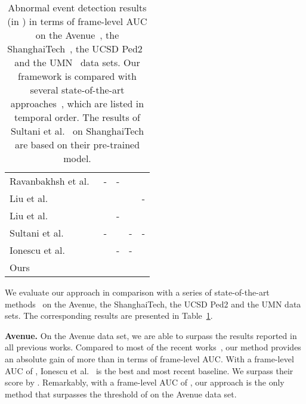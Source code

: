 \documentclass[10pt,twocolumn,letterpaper]{article}
\begin{document}
\begin{table}[t]
{\begin{center}
\begin{tabular}{|l|c|c|c|c|}
Ravanbakhsh et al.~\cite{Ravanbakhsh-WACV-2018}	& -			& -					&  			&  \\
Liu et al.~\cite{Liu-CVPR-2018}								& 			&  			& 			& - \\
Liu et al.~\cite{Liu-BMVC-2018}							& 			& - 					& 			&  \\
Sultani et al.~\cite{Sultani-CVPR-2018}					& -					& 			& -					& - \\
Ionescu et al.~\cite{Ionescu-WACV-2019}				& 			& -					& -					&  \\
\hline
Ours															& 	& 	& 	&  \\
\hline
\end{tabular}
\end{center}
\vspace*{-0.15cm}
\caption{Abnormal event detection results (in ) in terms of frame-level AUC on the Avenue~\cite{Lu-ICCV-2013}, the ShanghaiTech~\cite{Luo-ICCV-2017}, the UCSD Ped2~\cite{Mahadevan-CVPR-2010} and the UMN~\cite{Mehran-CVPR-2009} data sets. Our framework is compared with several state-of-the-art approaches~\cite{Cong-CVPR-2011,Giorno-ECCV-2016,Dutta-AAAI-2015,Hasan-CVPR-2016,Hinami-ICCV-2017,Ionescu-ICCV-2017,Ionescu-WACV-2019,Kim-CVPR-2009,Liu-CVPR-2018,Liu-BMVC-2018,Lu-ICCV-2013,Luo-ICCV-2017,Mahadevan-CVPR-2010,Mehran-CVPR-2009,Ravanbakhsh-WACV-2018,Ravanbakhsh-ICIP-2017,Sabokrou-IP-2017,Saligrama-CVPR-2012,Smeureanu-ICIAP-2017,Sultani-CVPR-2018,Xu-BMVC-2015,Xu-CVIU-2017,Zhang-PR-2016}, which are listed in temporal order. The results of Sultani et al.~\cite{Sultani-CVPR-2018} on ShanghaiTech are based on their pre-trained model.\label{tab_results}}
}
\vspace*{-0.4cm}
\end{table}

We evaluate our approach in comparison with a series of state-of-the-art methods~\cite{Cong-CVPR-2011,Giorno-ECCV-2016,Dutta-AAAI-2015,Hasan-CVPR-2016,Hinami-ICCV-2017,Ionescu-ICCV-2017,Kim-CVPR-2009,Liu-CVPR-2018,Liu-BMVC-2018,Lu-ICCV-2013,Luo-ICCV-2017,Mahadevan-CVPR-2010,Mehran-CVPR-2009,Ravanbakhsh-WACV-2018,Ravanbakhsh-ICIP-2017,Sabokrou-IP-2017,Saligrama-CVPR-2012,Smeureanu-ICIAP-2017,Xu-BMVC-2015,Xu-CVIU-2017,Zhang-PR-2016} on the Avenue, the ShanghaiTech, the UCSD Ped2 and the UMN data sets. The corresponding results are presented in Table~\ref{tab_results}. 

\noindent
{\bf Avenue.}
On the Avenue data set, we are able to surpass the results reported in all previous works. Compared to most of the recent works~\cite{Ionescu-ICCV-2017,Liu-CVPR-2018,Liu-BMVC-2018,Luo-ICCV-2017,Smeureanu-ICIAP-2017}, our method provides an absolute gain of more than  in terms of frame-level AUC. With a frame-level AUC of , Ionescu et al.~\cite{Ionescu-WACV-2019} is the best and most recent baseline. We surpass their score by . Remarkably, with a frame-level AUC of , our approach is the only method that surpasses the threshold of  on the Avenue data set.
\end{document}
